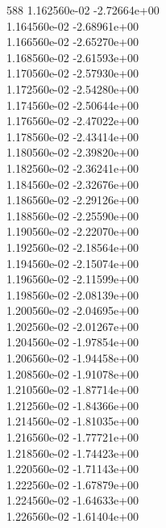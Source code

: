 588	1.162560e-02	-2.72664e+00	\\ 	1.164560e-02	-2.68961e+00	\\ 	1.166560e-02	-2.65270e+00	\\ 	1.168560e-02	-2.61593e+00	\\ 	1.170560e-02	-2.57930e+00	\\ 	1.172560e-02	-2.54280e+00	\\ 	1.174560e-02	-2.50644e+00	\\ 	1.176560e-02	-2.47022e+00	\\ 	1.178560e-02	-2.43414e+00	\\ 	1.180560e-02	-2.39820e+00	\\ 	1.182560e-02	-2.36241e+00	\\ 	1.184560e-02	-2.32676e+00	\\ 	1.186560e-02	-2.29126e+00	\\ 	1.188560e-02	-2.25590e+00	\\ 	1.190560e-02	-2.22070e+00	\\ 	1.192560e-02	-2.18564e+00	\\ 	1.194560e-02	-2.15074e+00	\\ 	1.196560e-02	-2.11599e+00	\\ 	1.198560e-02	-2.08139e+00	\\ 	1.200560e-02	-2.04695e+00	\\ 	1.202560e-02	-2.01267e+00	\\ 	1.204560e-02	-1.97854e+00	\\ 	1.206560e-02	-1.94458e+00	\\ 	1.208560e-02	-1.91078e+00	\\ 	1.210560e-02	-1.87714e+00	\\ 	1.212560e-02	-1.84366e+00	\\ 	1.214560e-02	-1.81035e+00	\\ 	1.216560e-02	-1.77721e+00	\\ 	1.218560e-02	-1.74423e+00	\\ 	1.220560e-02	-1.71143e+00	\\ 	1.222560e-02	-1.67879e+00	\\ 	1.224560e-02	-1.64633e+00	\\ 	1.226560e-02	-1.61404e+00	\\ \hline
